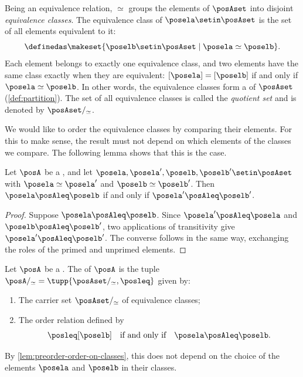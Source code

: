 Being an equivalence relation, $\simeq$ groups the elements of $\posAset$ into disjoint \emph{equivalence classes}.
The equivalence class of $\posela \setin \posAset$ is the set of all elements equivalent to it:
\begin{equation}
    [\posela] \definedas \makeset{ \poselb \setin \posAset \mid \posela \simeq \poselb }.
\end{equation}
Each element belongs to exactly one equivalence class, and two elements have the same class exactly when they are equivalent: $[\posela] = [\poselb]$ if and only if $\posela \simeq \poselb$.
In other words, the equivalence classes form a  of $\posAset$ (\cref{def:partition}).
The set of all equivalence classes is called the \emph{quotient set} and is denoted by $\posAset/_{\simeq}$.

We would like to order the equivalence classes by comparing their elements.
For this to make sense, the result must not depend on which elements of the classes we compare.
The following lemma shows that this is the case.

\begin{lemma}
    \label{lem:preorder-order-on-classes}
    Let $\posA$ be a , and let $\posela, \posela', \poselb, \poselb' \setin \posAset$ with $\posela \simeq \posela'$ and $\poselb \simeq \poselb'$.
    Then $\posela \posAleq \poselb$ if and only if $\posela' \posAleq \poselb'$.
\end{lemma}
\begin{proof}
    Suppose $\posela \posAleq \poselb$.
    Since $\posela' \posAleq \posela$ and $\poselb \posAleq \poselb'$, two applications of transitivity give $\posela' \posAleq \poselb'$.
    The converse follows in the same way, exchanging the roles of the primed and unprimed elements.
\end{proof}

\begin{ctdefinition}
    \label{def:preorder-quotient}
    Let $\posA$ be a .
    The  of $\posA$ is the tuple $\posA/_{\simeq} = \tupp{\posAset/_{\simeq}, \posleq}$ given by:

    \constit
    \begin{enumerate}
        \item The carrier set $\posAset/_{\simeq}$ of equivalence classes;
        \item The order relation defined by
              \begin{equation}
                  [\posela] \posleq [\poselb]
                  \quad \text{if and only if} \quad
                  \posela \posAleq \poselb.
              \end{equation}
    \end{enumerate}
    By \cref{lem:preorder-order-on-classes}, this does not depend on the choice of the elements $\posela$ and $\poselb$ in their classes.
\end{ctdefinition}

